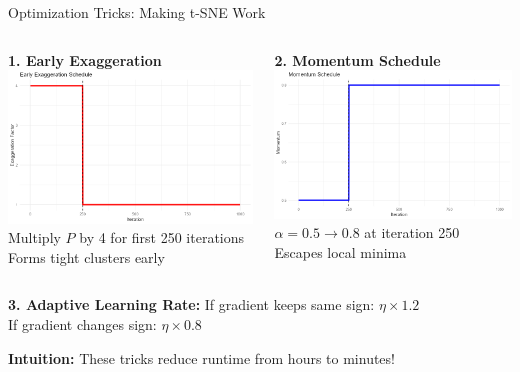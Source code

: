 \documentclass[aspectratio=169]{beamer}
\newcommand{\intuition}[1]{\colorbox{green!10}{\textcolor{intuitioncolor}{\textbf{Intuition:} #1}}}
\begin{document}
\begin{frame}{Optimization Tricks: Making t-SNE Work}
\begin{columns}
\textbf{1. Early Exaggeration}
\includegraphics[width=\textwidth]{./Figures/early_exaggeration.png}
Multiply $P$ by 4 for first 250 iterations\\
Forms tight clusters early

\textbf{2. Momentum Schedule}
\includegraphics[width=\textwidth]{./Figures/momentum_schedule.png}
$\alpha = 0.5 \to 0.8$ at iteration 250\\
Escapes local minima
\end{columns}

\vspace{0.3cm}
\textbf{3. Adaptive Learning Rate:}
If gradient keeps same sign: $\eta \times 1.2$\\
If gradient changes sign: $\eta \times 0.8$

\intuition{These tricks reduce runtime from hours to minutes!}
\end{frame}
\end{document}
